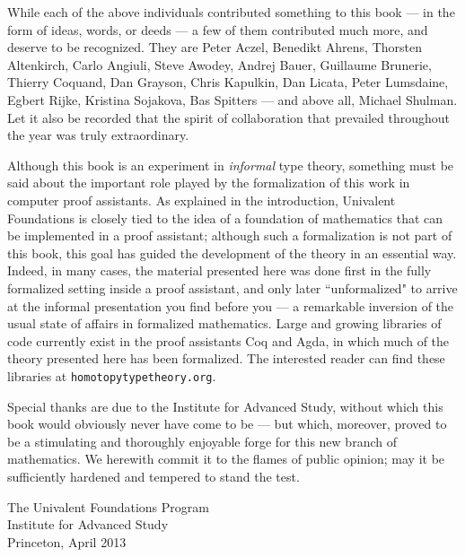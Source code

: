 \noindent While each of the above individuals contributed something to this book --- in the form of ideas, words, or deeds --- a few of them contributed much more, and deserve to be recognized.  They are Peter Aczel, Benedikt Ahrens, Thorsten Altenkirch,  Carlo Angiuli, Steve Awodey, Andrej Bauer, Guillaume Brunerie, Thierry Coquand, Dan Grayson, Chris Kapulkin, Dan Licata, Peter Lumsdaine, Egbert Rijke, Kristina Sojakova, Bas Spitters --- and above all, Michael Shulman.  Let it also be recorded that the spirit of collaboration that prevailed throughout the year was truly extraordinary. 


Although this book is an experiment in \emph{informal} type theory, something must be said about the important role played by the formalization of this work in computer proof assistants.  As explained in the introduction, Univalent Foundations is closely tied to the idea of a foundation of mathematics that can be implemented in a proof assistant; although such a formalization is not part of this book, this goal has guided the development of the theory in an essential way. Indeed, in many cases, the material presented here was done first in the fully formalized setting inside a proof assistant, and only later ``unformalized" to arrive at the informal presentation you find before you --- a remarkable inversion of the usual state of affairs in formalized mathematics.   Large and growing libraries of code currently exist in the proof assistants Coq and Agda, in which much of the theory presented here has been formalized.  The interested reader can find these libraries at {\tt homotopytypetheory.org}.

Special thanks are due to the Institute for Advanced Study, without which this book would obviously never have come to be --- but which, moreover, proved to be a stimulating and thoroughly enjoyable forge for this new branch of mathematics.  We herewith commit it to the flames of public opinion; may it be sufficiently hardened and tempered to stand the test. 

\bigskip

\begin{flushright}
The Univalent Foundations Program\\
Institute for Advanced Study\\
Princeton, April 2013
\end{flushright}

